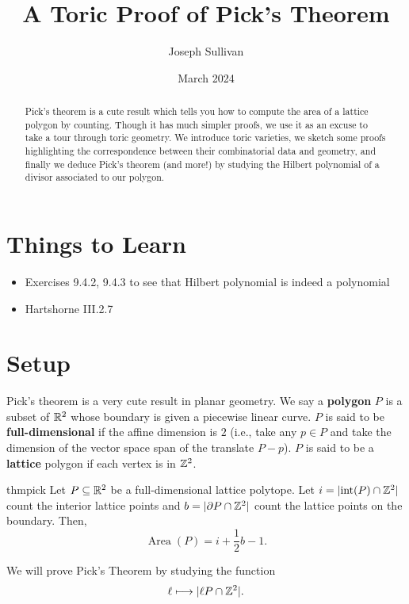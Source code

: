 \documentclass[12pt]{article}
\title{A Toric Proof of Pick's Theorem}
\author{Joseph Sullivan}
\date{March 2024}
\DeclareMathOperator{\Area}{Area}
\begin{document}
\maketitle

\begin{abstract}
    Pick's theorem is a cute result which tells you how to compute the area of a lattice polygon by counting. Though it has much simpler proofs, we use it as an excuse to take a tour through toric geometry. We introduce toric varieties, we sketch some proofs highlighting the correspondence between their combinatorial data and geometry, and finally we deduce Pick's theorem (and more!) by studying the Hilbert polynomial of a divisor associated to our polygon.
\end{abstract}

\tableofcontents

\section{Things to Learn}
\begin{itemize}
    \item Exercises 9.4.2, 9.4.3 to see that Hilbert polynomial is indeed a polynomial
    \item Hartshorne III.2.7
\end{itemize}

\section{Setup}

Pick's theorem is a very cute result in planar geometry. We say a \textbf{polygon} $P$ is a subset of $\mathbb{R}^2$ whose boundary is given a piecewise linear curve. $P$ is said to be \textbf{full-dimensional} if the affine dimension is $2$ (i.e., take any $p\in P$ and take the dimension of the vector space span of the translate $P-p$). $P$ is said to be a \textbf{lattice} polygon if each vertex is in $\mathbb{Z}^2$.

\begin{restatable}{thm}{pick}\label{thm:pick}
    Let $P\subseteq \mathbb{R}^2$ be a full-dimensional lattice polytope. Let $i=|\mathrm{int}(P) \cap \mathbb{Z}^2|$ count the interior lattice points and $b=|\partial P \cap \mathbb{Z}^2|$ count the lattice points on the boundary. Then,
    \[\Area(P) = i + \frac{1}{2}b - 1.\]
\end{restatable}

We will prove Pick's Theorem by studying the function
\[\ell \longmapsto |\ell P \cap \mathbb{Z}^2|.\]
\end{document}

